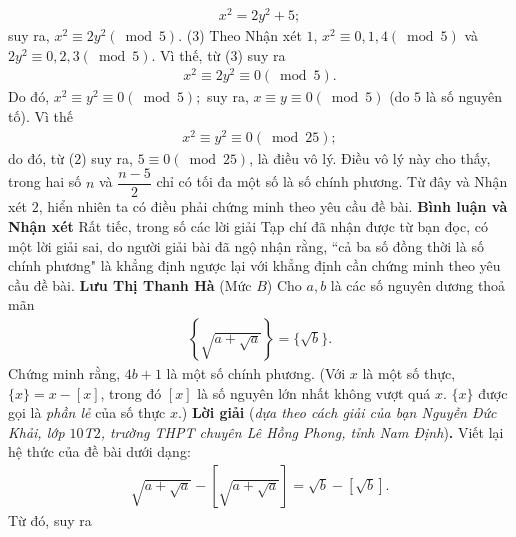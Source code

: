 \begin{multicols}{2}
	\begin{align*}
		{x^2} = 2{y^2} + 5; \tag{$2$}
	\end{align*}
	suy ra, ${x^2} \equiv 2{y^2}\left( {\bmod 5} \right)$. \hfill ($3$)
	\vskip 0.05cm
	Theo Nhận xét $1$, ${x^2} \equiv 0,1,4\left( {\bmod 5} \right)$  và  $2{y^2} \equiv 0,2,3\left( {\bmod 5} \right)$.
	\vskip 0.05cm 
	Vì thế, từ ($3$) suy ra
	\begin{align*}
		{x^2} \equiv 2{y^2} \equiv 0\left( {\bmod 5} \right).
	\end{align*}
	Do đó, ${x^2} \equiv {y^2} \equiv 0\left( {\bmod 5} \right);$  suy ra, \linebreak $x \equiv y \equiv 0\left( {\bmod 5} \right)$  (do $5$ là số nguyên tố). Vì thế
	\begin{align*}
		{x^2} \equiv {y^2} \equiv 0\left( {\bmod 25} \right);
	\end{align*}
	do đó, từ ($2$) suy ra,  $5 \equiv 0\left( {\bmod 25} \right)$, là điều vô lý. Điều vô lý này cho thấy, trong hai số $n$ và $\dfrac{n-5}{2}$  chỉ có tối đa một số là số chính phương. Từ đây và Nhận xét $2$, hiển nhiên ta có điều phải chứng minh theo yêu cầu đề bài.
	\vskip 0.05cm
	\textbf{\color{thachthuctoanhoc}Bình luận và Nhận xét}
	\vskip 0.05cm
	Rất tiếc, trong số các lời giải Tạp chí đã nhận được từ bạn đọc, có một lời giải sai, do người giải bài đã ngộ nhận rằng, ``cả ba số đồng thời là số chính phương" là khẳng định ngược lại với khẳng định cần chứng minh theo yêu cầu đề bài.
	\vskip 0.05cm
	\hfill	\textbf{\color{thachthuctoanhoc}Lưu Thị Thanh Hà}
	\vskip 0.05cm
	{}
	(Mức $B$) Cho $a,b$ là các số nguyên dương thoả mãn
	\begin{align*}
		\left\{ \sqrt{a+\sqrt{a}}\right\}=\{\sqrt b\}.
	\end{align*}
	Chứng minh rằng, $4b+1$ là một số chính phương.
	\vskip 0.05cm
	(Với $x$ là một số thực, $\{x\}=x-[x]$, trong đó $[x]$ là số nguyên lớn nhất không vượt quá $x$. $\{x\}$ được gọi là {\it phần lẻ} của số thực $x$.)
	\vskip 0.05cm
	\textbf{\color{thachthuctoanhoc}Lời giải} (\textit{dựa theo cách giải của bạn Nguyễn Đức Khải, lớp $10$T$2$, trường THPT chuyên Lê Hồng Phong, tỉnh Nam Định})\textbf{\color{thachthuctoanhoc}.}
	\vskip 0.05cm
	Viết lại hệ thức của đề bài dưới dạng:
	\begin{align*}
		\sqrt {a + \sqrt a }  - \left[ {\sqrt {a + \sqrt a } } \right] = \sqrt b  - \left[ {\sqrt b } \right].
	\end{align*}
	Từ đó, suy ra
	\begin{align*}

\end{align*}
\end{multicols}
